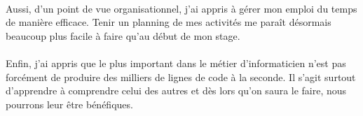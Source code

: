 \documentclass[12pt]{report}
\begin{document}
\paragraph{}
Aussi, d'un point de vue organisationnel, j'ai appris à gérer mon emploi du temps de manière efficace. Tenir un planning de mes activités me paraît désormais beaucoup plus facile à faire qu'au début de mon stage. 

\paragraph{}
Enfin, j'ai appris que le plus important dans le métier d'informaticien n'est pas forcément de produire des milliers de lignes de code à la seconde. 
Il s'agit surtout d'apprendre à comprendre celui des autres et dès lors qu'on saura le faire, nous pourrons leur être bénéfiques.

\nocite{*}
\printbibliography
\end{document}
